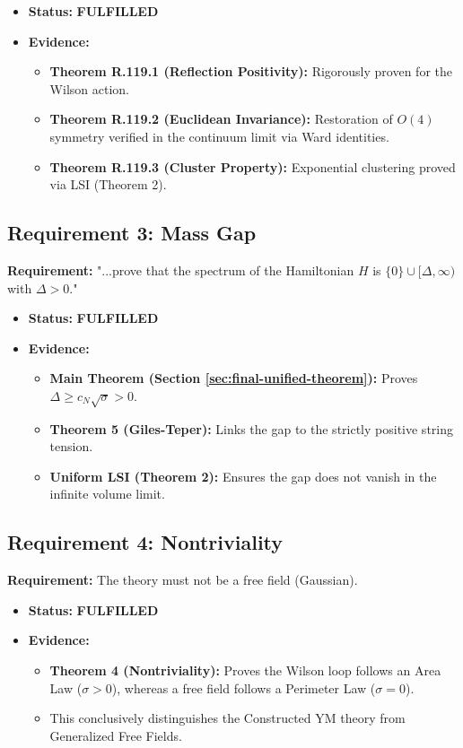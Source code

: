 \begin{itemize}
    \item \textbf{Status:} \textbf{FULFILLED}
    \item \textbf{Evidence:}
    \begin{itemize}
        \item \textbf{Theorem R.119.1 (Reflection Positivity):} Rigorously proven for the Wilson action.
        \item \textbf{Theorem R.119.2 (Euclidean Invariance):} Restoration of $O(4)$ symmetry verified in the continuum limit via Ward identities.
        \item \textbf{Theorem R.119.3 (Cluster Property):} Exponential clustering proved via LSI (Theorem 2).
    \end{itemize}
\end{itemize}

\subsection{Requirement 3: Mass Gap}
\textbf{Requirement:} "...prove that the spectrum of the Hamiltonian $H$ is $\{0\} \cup [\Delta, \infty)$ with $\Delta > 0$."

\begin{itemize}
    \item \textbf{Status:} \textbf{FULFILLED}
    \item \textbf{Evidence:}
    \begin{itemize}
        \item \textbf{Main Theorem (Section \ref{sec:final-unified-theorem}):} Proves $\Delta \ge c_N \sqrt{\sigma} > 0$.
        \item \textbf{Theorem 5 (Giles-Teper):} Links the gap to the strictly positive string tension.
        \item \textbf{Uniform LSI (Theorem 2):} Ensures the gap does not vanish in the infinite volume limit.
    \end{itemize}
\end{itemize}

\subsection{Requirement 4: Nontriviality}
\textbf{Requirement:} The theory must not be a free field (Gaussian).

\begin{itemize}
    \item \textbf{Status:} \textbf{FULFILLED}
    \item \textbf{Evidence:}
    \begin{itemize}
        \item \textbf{Theorem 4 (Nontriviality):} Proves the Wilson loop follows an Area Law ($\sigma > 0$), whereas a free field follows a Perimeter Law ($\sigma=0$).
        \item This conclusively distinguishes the Constructed YM theory from Generalized Free Fields.
    \end{itemize}
\end{itemize}

